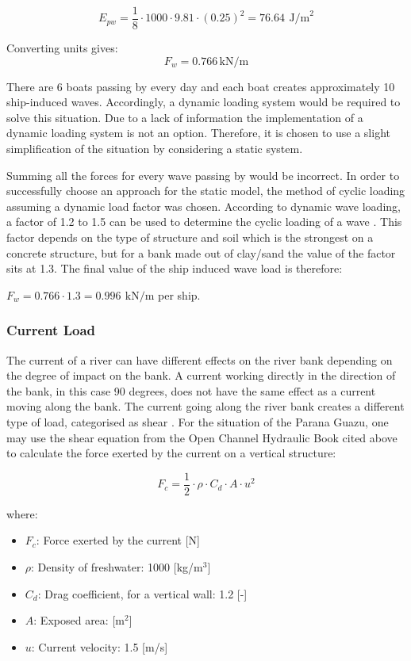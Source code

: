 $$
E_{pw} = \frac{1}{8} \cdot 1000 \cdot 9.81 \cdot (0.25)^2 = 76.64 \, ~\text{J/m}^2
$$

Converting units gives:
$$
{F_w}= 0.766 \, \text{kN/m}
$$

There are 6 boats passing by every day and each boat creates approximately 10 ship-induced waves. Accordingly, a dynamic loading system would be required to solve this situation. Due to a lack of information the implementation of a dynamic loading system is not an option. Therefore, it is chosen to use a slight simplification of the situation by considering a static system. 

Summing all the forces for every wave passing by would be incorrect. In order to successfully choose an approach for the static model, the method of cyclic loading assuming a dynamic load factor was chosen. According to dynamic wave loading, a factor of 1.2 to 1.5 can be used to determine the cyclic loading of a wave \autocite{cuomoDynamicWaveLoads2004}. This factor depends on the type of structure and soil which is the strongest on a concrete structure, but for a bank made out of clay/sand the value of the factor sits at 1.3. The final value of the ship induced wave load is therefore:

$ F_{w} = 0.766 \cdot 1.3 = 0.996  \, ~\text{kN/m}$ per ship. 

\subsubsection{Current Load}
The current of a river can have different effects on the river bank depending on the degree of impact on the bank. A current working directly in the direction of the bank, in this case 90 degrees, does not have the same effect as a current moving along the bank. The current going along the river bank creates a different type of load, categorised as shear \autocite{chowOpenChannelHydraulics}.
For the situation of the Parana Guazu, one may use the shear equation from the Open Channel Hydraulic Book cited above to calculate the force exerted by the current on a vertical structure:


\begin{equation}
\label{eq:drag load}
    F_c = \frac{1}{2} \cdot \rho \cdot C_d \cdot A \cdot u^2
\end{equation}


\noindent where:
\begin{itemize}
    \item \textbf{$ F_c $}: Force exerted by the current [N]
    \item \textbf{$ \rho $}: Density of freshwater: 1000 [kg/m$^3$]
    \item \textbf{$ C_d $}: Drag coefficient, for a vertical wall: 1.2 [-]
    \item \textbf{$ A $}: Exposed area:  [m$^2$]
    \item \textbf{$ u $}: Current velocity: 1.5 [m/s]
\end{itemize}

